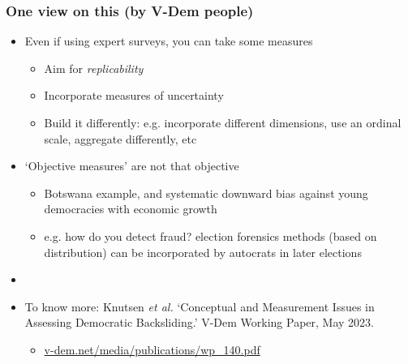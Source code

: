 \documentclass[aspectratio=43]{beamer}
\begin{document}

\begin{frame}
\frametitle{One view on this (by V-Dem people)}
\centering

\begin{itemize}
  \item Even if using expert surveys, you can take some measures
  \begin{itemize}
    \item Aim for \textit{replicability}
    \item Incorporate measures of uncertainty
    \item Build it differently: e.g. incorporate different dimensions, use an ordinal scale, aggregate differently, etc
  \end{itemize}
  \item `Objective measures' are not that objective
  \begin{itemize}
    \item Botswana example, and systematic downward bias against young democracies with economic growth
    \item e.g. how do you detect fraud? election forensics methods (based on distribution) can be incorporated by autocrats in later elections
  \end{itemize}
  \item[]
  \item {\small To know more: Knutsen \textit{et al.} `Conceptual and Measurement Issues in Assessing Democratic Backsliding.' V-Dem Working Paper, May 2023.}
  \begin{itemize}
    \item \url{v-dem.net/media/publications/wp_140.pdf}
  \end{itemize}
\end{itemize}

\end{frame}
\end{document}
